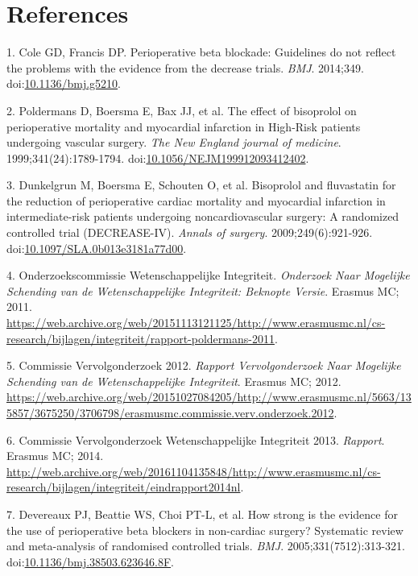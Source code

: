 \documentclass[]{article}
\begin{document}
\section*{References}\label{references}

\hypertarget{refs}{}
\hypertarget{ref-Coleg5210}{}
1. Cole GD, Francis DP. Perioperative beta blockade: Guidelines do not
reflect the problems with the evidence from the decrease trials.
\emph{BMJ}. 2014;349.
doi:\href{https://doi.org/10.1136/bmj.g5210}{10.1136/bmj.g5210}.

\hypertarget{ref-poldermans1999}{}
2. Poldermans D, Boersma E, Bax JJ, et al. The effect of bisoprolol on
perioperative mortality and myocardial infarction in High-Risk patients
undergoing vascular surgery. \emph{The New England journal of medicine}.
1999;341(24):1789-1794.
doi:\href{https://doi.org/10.1056/NEJM199912093412402}{10.1056/NEJM199912093412402}.

\hypertarget{ref-dunkelgrun2009}{}
3. Dunkelgrun M, Boersma E, Schouten O, et al. Bisoprolol and
fluvastatin for the reduction of perioperative cardiac mortality and
myocardial infarction in intermediate-risk patients undergoing
noncardiovascular surgery: A randomized controlled trial (DECREASE-IV).
\emph{Annals of surgery}. 2009;249(6):921-926.
doi:\href{https://doi.org/10.1097/SLA.0b013e3181a77d00}{10.1097/SLA.0b013e3181a77d00}.

\hypertarget{ref-commissie2011}{}
4. Onderzoekscommissie Wetenschappelijke Integriteit. \emph{Onderzoek
Naar Mogelijke Schending van de Wetenschappelijke Integriteit: Beknopte
Versie}. Erasmus MC; 2011.
\url{https://web.archive.org/web/20151113121125/http://www.erasmusmc.nl/cs-research/bijlagen/integriteit/rapport-poldermans-2011}.

\hypertarget{ref-commissie2012}{}
5. Commissie Vervolgonderzoek 2012. \emph{Rapport Vervolgonderzoek Naar
Mogelijke Schending van de Wetenschappelijke Integriteit}. Erasmus MC;
2012.
\url{https://web.archive.org/web/20151027084205/http://www.erasmusmc.nl/5663/135857/3675250/3706798/erasmusmc.commissie.verv.onderzoek.2012}.

\hypertarget{ref-commissie2013}{}
6. Commissie Vervolgonderzoek Wetenschappelijke Integriteit 2013.
\emph{Rapport}. Erasmus MC; 2014.
\url{http://web.archive.org/web/20161104135848/http://www.erasmusmc.nl/cs-research/bijlagen/integriteit/eindrapport2014nl}.

\hypertarget{ref-Devereaux313}{}
7. Devereaux PJ, Beattie WS, Choi PT-L, et al. How strong is the
evidence for the use of perioperative beta blockers in non-cardiac
surgery? Systematic review and meta-analysis of randomised controlled
trials. \emph{BMJ}. 2005;331(7512):313-321.
doi:\href{https://doi.org/10.1136/bmj.38503.623646.8F}{10.1136/bmj.38503.623646.8F}.
\end{document}
